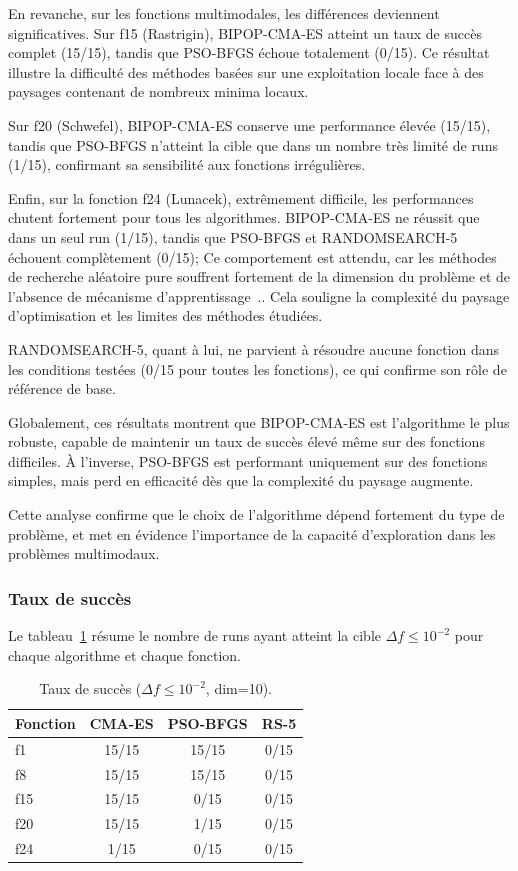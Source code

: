\documentclass[conference]{IEEEtran}
\begin{document}
En revanche, sur les fonctions multimodales, les diff\'erences deviennent significatives. Sur f15 (Rastrigin), BIPOP-CMA-ES atteint un taux de succ\`es complet (15/15), tandis que PSO-BFGS \'echoue totalement (0/15). Ce r\'esultat illustre la difficult\'e des m\'ethodes bas\'ees sur une exploitation locale face \`a des paysages contenant de nombreux minima locaux.

Sur f20 (Schwefel), BIPOP-CMA-ES conserve une performance \'elev\'ee (15/15), tandis que PSO-BFGS n'atteint la cible que dans un nombre tr\`es limit\'e de runs (1/15), confirmant sa sensibilit\'e aux fonctions irr\'eguli\`eres.

Enfin, sur la fonction f24 (Lunacek), extr\^emement difficile, les performances chutent fortement pour tous les algorithmes. BIPOP-CMA-ES ne r\'eussit que dans un seul run (1/15), tandis que PSO-BFGS et RANDOMSEARCH-5 \'echouent compl\`etement (0/15); Ce comportement est attendu, car les m\'ethodes de recherche al\'eatoire pure souffrent fortement de la dimension du probl\`eme et de l'absence de m\'ecanisme d'apprentissage~\cite{auger2009random}.. Cela souligne la complexit\'e du paysage d'optimisation et les limites des m\'ethodes \'etudi\'ees.

RANDOMSEARCH-5, quant \`a lui, ne parvient \`a r\'esoudre aucune fonction dans les conditions test\'ees (0/15 pour toutes les fonctions), ce qui confirme son r\^ole de r\'ef\'erence de base.

Globalement, ces r\'esultats montrent que BIPOP-CMA-ES est l'algorithme le plus robuste, capable de maintenir un taux de succ\`es \'elev\'e m\^eme sur des fonctions difficiles. \`A l'inverse, PSO-BFGS est performant uniquement sur des fonctions simples, mais perd en efficacit\'e d\`es que la complexit\'e du paysage augmente.

Cette analyse confirme que le choix de l'algorithme d\'epend fortement du type de probl\`eme, et met en \'evidence l'importance de la capacit\'e d'exploration dans les probl\`emes multimodaux.

\subsubsection{Taux de succ\`es}

Le tableau~\ref{tab:success} r\'esume le nombre de runs ayant atteint la cible $\Delta f \leq 10^{-2}$ pour chaque algorithme et chaque fonction.

\begin{table}[H]
\centering
\caption{Taux de succ\`es ($\Delta f \leq 10^{-2}$, dim=10).}
\label{tab:success}
\begin{tabular}{lccc}
\toprule
Fonction & CMA-ES & PSO-BFGS & RS-5 \\
\midrule
f1  & 15/15 & 15/15 & 0/15 \\
f8  & 15/15 & 15/15 & 0/15 \\
f15 & 15/15 & 0/15  & 0/15 \\
f20 & 15/15 & 1/15  & 0/15 \\
f24 & 1/15  & 0/15  & 0/15 \\
\bottomrule
\end{tabular}
\end{table}
\end{document}
